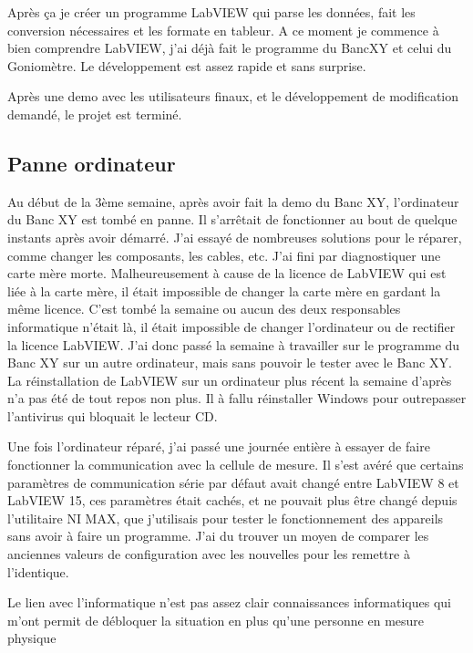 \documentclass[a4paper, 12pt]{article}
\begin{document}
Après ça je créer un programme LabVIEW qui parse les données, fait les conversion nécessaires et les formate en tableur.
A ce moment je commence à bien comprendre LabVIEW, j'ai déjà fait le programme du BancXY et celui du Goniomètre.
Le développement est assez rapide et sans surprise.

Après une demo avec les utilisateurs finaux, et le développement de modification demandé, le projet est terminé.  

\subsection{ Panne ordinateur }

Au début de la 3ème semaine, après avoir fait la demo du Banc XY, l'ordinateur du Banc XY est tombé en panne.
Il s'arrêtait de fonctionner au bout de quelque instants après avoir démarré.
J'ai essayé de nombreuses solutions pour le réparer, comme changer les composants, les cables, etc.
J'ai fini par diagnostiquer une carte mère morte.
Malheureusement à cause de la licence de LabVIEW qui est liée à la carte mère, il était impossible de changer la carte mère en gardant la même licence.
C'est tombé la semaine ou aucun des deux responsables informatique n'était là, il était impossible de changer l'ordinateur ou de rectifier la licence LabVIEW.  
J'ai donc passé la semaine à travailler sur le programme du Banc XY sur un autre ordinateur, mais sans pouvoir le tester avec le Banc XY.  
La réinstallation de LabVIEW sur un ordinateur plus récent la semaine d'après n'a pas été de tout repos non plus.
Il à fallu réinstaller Windows pour outrepasser l'antivirus qui bloquait le lecteur CD.  

Une fois l'ordinateur réparé, j'ai passé une journée entière à essayer de faire fonctionner la communication avec la cellule de mesure.
Il s'est avéré que certains paramètres de communication série par défaut avait changé entre LabVIEW 8 et LabVIEW 15, ces paramètres était cachés, et ne pouvait plus être changé depuis l'utilitaire NI MAX, que j'utilisais pour tester le fonctionnement des appareils sans avoir à faire un programme.
J'ai du trouver un moyen de comparer les anciennes valeurs de configuration avec les nouvelles pour les remettre à l'identique.







Le lien avec l'informatique n'est pas assez clair
connaissances informatiques qui m'ont permit de débloquer la situation
en plus qu'une personne en mesure physique
\end{document}
